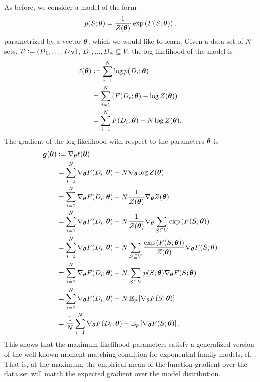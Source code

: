 As before, we consider a model of the form
\begin{align*}
p(S; \bm{\theta}) = \frac{1}{Z(\bm{\theta})} \exp\left( F(S; \bm{\theta}) \right),
\end{align*}
parametrized by a vector $\bm{\theta}$, which we would like to learn.
Given a data set of $N$ sets, $\mathcal{D} \vcentcolon= (D_1,\ldots,D_N)$, $D_1,\ldots,D_N \subseteq V$, the log-likelihood of the model is
\begin{align*}
\ell(\bm{\theta}) &\vcentcolon= \sum_{i=1}^N \log p(D_i; \bm{\theta})\\
           &= \sum_{i=1}^N \left( F(D_i; \bm{\theta}) - \log Z(\bm{\theta}) \right)\\
           &= \sum_{i=1}^N F(D_i; \bm{\theta}) - N \log Z(\bm{\theta}).
\end{align*}
The gradient of the log-likelihood with respect to the parameters $\bm{\theta}$ is
\begin{align*}
                 \bm{g}(\bm{\theta}) &\vcentcolon= \nabla_{\bm{\theta}} \ell(\bm{\theta})\\
                              &= \sum_{i=1}^N \nabla_{\bm{\theta}} F(D_i; \bm{\theta}) - N \nabla_{\bm{\theta}} \log Z(\bm{\theta})\\
                              &= \sum_{i=1}^N \nabla_{\bm{\theta}} F(D_i; \bm{\theta}) - N \frac{1}{Z(\bm{\theta})} \nabla_{\bm{\theta}} Z(\bm{\theta})\\
                              &= \sum_{i=1}^N \nabla_{\bm{\theta}} F(D_i; \bm{\theta}) - N \frac{1}{Z(\bm{\theta})} \nabla_{\bm{\theta}} \sum_{S \subseteq V} \exp\left( F(S; \bm{\theta}) \right)\\
                              &= \sum_{i=1}^N \nabla_{\bm{\theta}} F(D_i; \bm{\theta}) - N \sum_{S \subseteq V} \frac{\exp\left( F(S; \bm{\theta})\right)}{Z(\bm{\theta})} \nabla_{\bm{\theta}} F(S; \bm{\theta})\\
                              &= \sum_{i=1}^N \nabla_{\bm{\theta}} F(D_i; \bm{\theta}) - N \sum_{S \subseteq V} p(S; \bm{\theta}) \nabla_{\bm{\theta}} F(S; \bm{\theta})\\
                              &= \sum_{i=1}^N \nabla_{\bm{\theta}} F(D_i; \bm{\theta}) - N\,\mathbb{E}_{p}\left[ \nabla_{\bm{\theta}} F(S; \bm{\theta}) \right]\\
                              &= \frac{1}{N}\sum_{i=1}^N \nabla_{\bm{\theta}} F(D_i; \bm{\theta}) - \mathbb{E}_{p}\left[ \nabla_{\bm{\theta}} F(S; \bm{\theta}) \right].
\end{align*}
This shows that the maximum likelihood parameters satisfy a generalized version of the well-known moment matching condition for exponential family models; cf. \cite[Ch. 20]{koller09}.
That is, at the maximum, the empirical mean of the function gradient over the data set will match the expected gradient over the model distribution.

